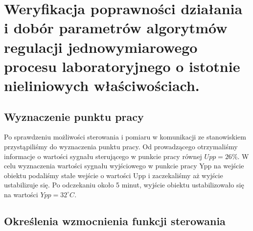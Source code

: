 \chapter{Weryfikacja poprawności działania i dobór parametrów
algorytmów regulacji jednowymiarowego procesu laboratoryjnego o
istotnie nieliniowych właściwościach.}

\section{Wyznaczenie punktu pracy}
Po sprawdzeniu możliwości sterowania i pomiaru w komunikacji ze stanowiskiem
przystąpiliśmy do wyznaczenia punktu pracy. Od prowadzącego otrzymaliśmy
informacje o wartości sygnału sterującego w punkcie pracy równej
$Upp = 26\%$. W celu wyznaczenia wartości sygnału wyjściowego w punkcie pracy
Ypp na wejście obiektu podaliśmy stałe wejście o wartości Upp i zaczekaliśmy aż
wyjście ustabilizuje się. Po odczekaniu około 5 minut, wyjście obiektu ustabilizowało
się na wartości $ Ypp = 32^{\circ} C$.

\section{Określenia wzmocnienia funkcji sterowania}

